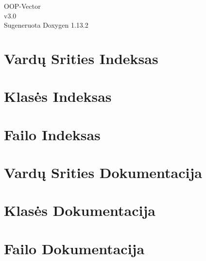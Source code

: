 \documentclass[twoside]{book}
\newcommand{\+}{\discretionary{\mbox{\scriptsize$\hookleftarrow$}}{}{}}
\newcommand{\clearemptydoublepage}{%
    \newpage{\pagestyle{empty}\cleardoublepage}%
  }
\begin{document}
  \raggedbottom
    \hypersetup{pageanchor=false,
                bookmarksnumbered=true,
                pdfencoding=unicode
               }
  \begin{titlepage}
  \vspace*{7cm}
  \begin{center}%
  {\Large OOP-\/\+Vector}\\
  [1ex]\large v3.\+0 \\
  \vspace*{1cm}
  {\large Sugeneruota Doxygen 1.13.2}\\
  \end{center}
  \end{titlepage}
  \clearemptydoublepage
  \tableofcontents
  \clearemptydoublepage
  \hypersetup{pageanchor=true}
\chapter{Vardų Srities Indeksas}

\chapter{Klasės Indeksas}

\chapter{Failo Indeksas}

\chapter{Vardų Srities Dokumentacija}

\chapter{Klasės Dokumentacija}


\chapter{Failo Dokumentacija}




  \backmatter
  \newpage
  \clearemptydoublepage
  \printindex
\end{document}
